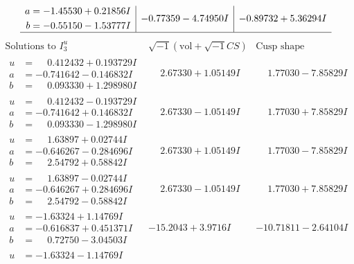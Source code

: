 \documentclass[1p]{elsarticle_modified}
\theoremstyle{definition}
\newcommand{\I}{\sqrt{-1}}
\begin{document}
$$\begin{array}{c|c|c}
\begin{aligned}
a &= -1.45530 + 0.21856 I \\
b &= -0.55150 - 1.53777 I\end{aligned}
 & -0.77359 - 4.74950 I & -0.89732 + 5.36294 I\\
 \hline 
 \end{array}$$\newpage$$\begin{array}{c|c|c}  
\text{Solutions to }I^u_{3}& \I (\text{vol} + \sqrt{-1}CS) & \text{Cusp shape}\\
 \hline 
\begin{aligned}
u &= \phantom{-}0.412432 + 0.193729 I \\
a &= -0.741642 - 0.146832 I \\
b &= \phantom{-}0.093330 + 1.298980 I\end{aligned}
 & \phantom{-}2.67330 + 1.05149 I & \phantom{-}1.77030 - 7.85829 I \\ \hline\begin{aligned}
u &= \phantom{-}0.412432 - 0.193729 I \\
a &= -0.741642 + 0.146832 I \\
b &= \phantom{-}0.093330 - 1.298980 I\end{aligned}
 & \phantom{-}2.67330 - 1.05149 I & \phantom{-}1.77030 + 7.85829 I \\ \hline\begin{aligned}
u &= \phantom{-}1.63897 + 0.02744 I \\
a &= -0.646267 - 0.284696 I \\
b &= \phantom{-}2.54792 + 0.58842 I\end{aligned}
 & \phantom{-}2.67330 + 1.05149 I & \phantom{-}1.77030 - 7.85829 I \\ \hline\begin{aligned}
u &= \phantom{-}1.63897 - 0.02744 I \\
a &= -0.646267 + 0.284696 I \\
b &= \phantom{-}2.54792 - 0.58842 I\end{aligned}
 & \phantom{-}2.67330 - 1.05149 I & \phantom{-}1.77030 + 7.85829 I \\ \hline\begin{aligned}
u &= -1.63324 + 1.14769 I \\
a &= -0.616837 + 0.451371 I \\
b &= \phantom{-}0.72750 - 3.04503 I\end{aligned}
 & -15.2043 + 3.9716 I & -10.71811 - 2.64104 I \\ \hline\begin{aligned}
u &= -1.63324 - 1.14769 I \\

\end{aligned}
\end{array}$$
\end{document}
